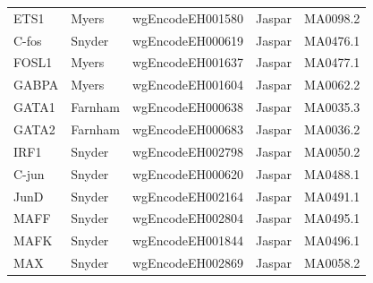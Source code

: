 \documentclass{bioinfo}
\begin{document}
\begin{table}[t]
\begin{center}
\begin{tabular}{ l|ll|ll }
        ETS1    & Myers   & wgEncodeEH001580 & Jaspar     & MA0098.2 \\
        C-fos     & Snyder  & wgEncodeEH000619 & Jaspar     & MA0476.1 \\
        FOSL1   & Myers   & wgEncodeEH001637 & Jaspar     & MA0477.1 \\
        GABPA    & Myers   & wgEncodeEH001604 & Jaspar     & MA0062.2 \\
        GATA1   & Farnham & wgEncodeEH000638 & Jaspar     & MA0035.3 \\
        GATA2   & Farnham & wgEncodeEH000683 & Jaspar     & MA0036.2 \\
        IRF1    & Snyder  & wgEncodeEH002798 & Jaspar     & MA0050.2 \\
        C-jun     & Snyder  & wgEncodeEH000620 & Jaspar     & MA0488.1 \\
        JunD    & Snyder  & wgEncodeEH002164 & Jaspar     & MA0491.1 \\
        MAFF    & Snyder  & wgEncodeEH002804 & Jaspar     & MA0495.1 \\
        MAFK    & Snyder  & wgEncodeEH001844 & Jaspar     & MA0496.1 \\
        MAX     & Snyder  & wgEncodeEH002869 & Jaspar     & MA0058.2 \\
        \hline
    \end{tabular}
\end{center}
\end{table}
\end{document}
